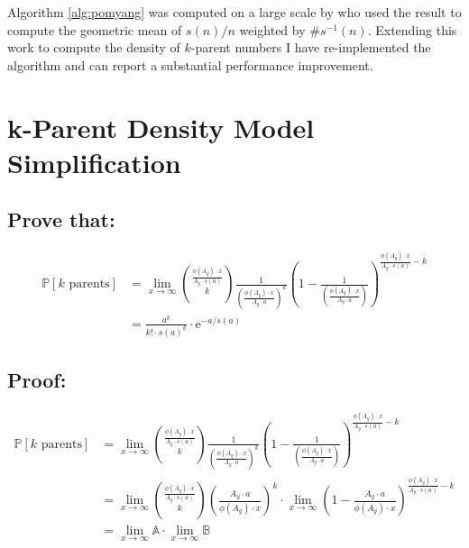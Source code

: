 \documentclass{article}
\theoremstyle{definition}
\begin{document}
Algorithm \ref{alg:pomyang} was computed on a large scale by \cite{chum_guy_jacobson_mosunov_2018} who used the result to compute the geometric mean of $s(n) / n$ weighted by $\#s^{-1}(n)$. Extending this work to compute the density of $k$-parent numbers I have re-implemented the algorithm and can report a substantial performance improvement.

\appendix
\section{k-Parent Density Model Simplification}
\subsection*{Prove that:}
\begin{align*}
    \mathbb{P}[k \text{ parents}] & =  \lim_{x \to \infty}{\frac{\phi(A_y) \cdot x}{A_y \cdot s(a)} \choose k } \frac{1}{\left(\frac{\phi(A_y) \cdot x}{ A_y \cdot a}\right)^k} \left(1- \frac{1}{\left(\frac{\phi(A_y) \cdot x}{ A_y \cdot a}\right)}\right)^{\frac{\phi(A_y) \cdot x}{A_y \cdot s(a)  } -k} \\
                                  & = \frac{a^{k}}{k! \cdot s(a)^k} \cdot \text{e}^{-a/s(a)}
\end{align*}

\subsection*{Proof:} \begin{align*}
    \mathbb{P}[k \text{ parents}] & =  \lim_{x \to \infty}{\frac{\phi(A_y) \cdot x}{A_y \cdot s(a)} \choose k } \frac{1}{\left(\frac{\phi(A_y) \cdot x}{ A_y \cdot a}\right)^k} \left(1- \frac{1}{\left(\frac{\phi(A_y) \cdot x}{ A_y \cdot a}\right)}\right)^{\frac{\phi(A_y) \cdot x}{A_y \cdot s(a)  } -k} \\
                                  & =  \lim_{x \to \infty}{\frac{\phi(A_y) \cdot x}{A_y \cdot s(a)} \choose k } \left(\frac{A_y \cdot a}{\phi(A_y) \cdot x}\right)^k \cdot \lim_{x \to \infty}\left(1- \frac{A_y \cdot a}{\phi(A_y) \cdot x}\right)^{\frac{\phi(A_y) \cdot x}{A_y \cdot s(a)  } -k}           \\
                                  & =  \lim_{x \to \infty}\mathbb{A}  \cdot \lim_{x \to \infty} \mathbb{B}
\end{align*}
\end{document}
